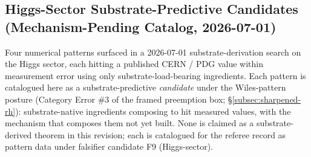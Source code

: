 \documentclass[11pt,a4paper]{amsart}
\theoremstyle{plain}
\theoremstyle{definition}
\begin{document}
\subsection{Higgs-Sector Substrate-Predictive Candidates (Mechanism-Pending Catalog, 2026-07-01)}\label{subsec:higgs-sector-candidates}

Four numerical patterns surfaced in a 2026-07-01 substrate-derivation search on the Higgs sector, each hitting a published CERN / PDG value within measurement error using only substrate-load-bearing ingredients. Each pattern is catalogued here as a substrate-predictive \emph{candidate} under the Wiles-pattern posture (Category Error \#3 of the framed preemption box; \S\ref{subsec:sharpened-rh}): substrate-native ingredients composing to hit measured values, with the mechanism that composes them not yet built. None is claimed as a substrate-derived theorem in this revision; each is catalogued for the referee record as pattern data under falsifier candidate F9 (Higgs-sector).
\end{document}
